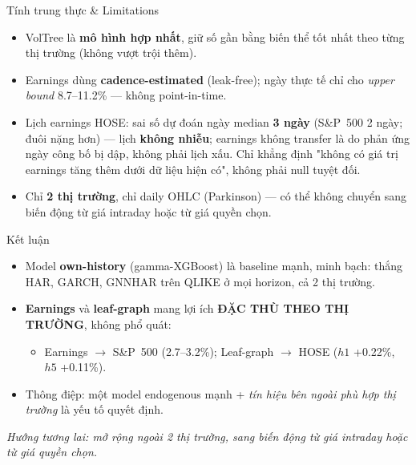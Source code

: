 \documentclass[aspectratio=169]{beamer}
\begin{document}
\begin{frame}{Tính trung thực \& Limitations}
  \begin{itemize}
    \item VolTree là \textbf{mô hình hợp nhất}, giữ số gần bằng biến thể tốt nhất theo từng thị trường (không vượt trội thêm).
    \item Earnings dùng \textbf{cadence-estimated} (leak-free); ngày thực tế chỉ cho \emph{upper bound} 8.7--11.2\% --- không point-in-time.
    \item Lịch earnings HOSE: sai số dự đoán ngày median \textbf{3 ngày} (S\&P~500 2 ngày; đuôi nặng hơn) --- lịch \textbf{không nhiễu}; earnings không transfer là do phản ứng ngày công bố bị dập, không phải lịch xấu. Chỉ khẳng định "không có giá trị earnings tăng thêm dưới dữ liệu hiện có", không phải null tuyệt đối.
    \item Chỉ \textbf{2 thị trường}, chỉ daily OHLC (Parkinson) --- có thể không chuyển sang biến động từ giá intraday hoặc từ giá quyền chọn.
  \end{itemize}
\end{frame}

\begin{frame}{Kết luận}
  \begin{itemize}
    \item Model \textbf{own-history} (gamma-XGBoost) là baseline mạnh, minh bạch: thắng HAR, GARCH, GNNHAR trên QLIKE ở mọi horizon, cả 2 thị trường.
    \item \textbf{Earnings} và \textbf{leaf-graph} mang lợi ích \textbf{ĐẶC THÙ THEO THỊ TRƯỜNG}, không phổ quát:
      \begin{itemize}
        \item Earnings $\to$ S\&P~500 (2.7--3.2\%); Leaf-graph $\to$ HOSE ($h1$ +0.22\%, $h5$ +0.11\%).
      \end{itemize}
    \item Thông điệp: một model endogenous mạnh + \emph{tín hiệu bên ngoài phù hợp thị trường} là yếu tố quyết định.
  \end{itemize}
  \vspace{0.5em}
  \begin{center}
    \textit{Hướng tương lai: mở rộng ngoài 2 thị trường, sang biến động từ giá intraday hoặc từ giá quyền chọn.}
  \end{center}
\end{frame}
\end{document}
